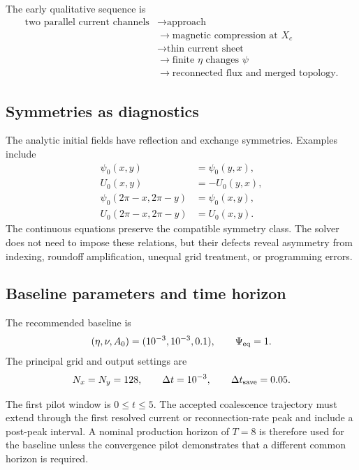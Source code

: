 \documentclass[11pt]{article}
\begin{document}
The early qualitative sequence is
\[
\begin{aligned}
\text{two parallel current channels}
&\longrightarrow \text{approach}\\
&\longrightarrow \text{magnetic compression at }X_c\\
&\longrightarrow \text{thin current sheet}\\
&\longrightarrow \text{finite }\eta\text{ changes }\psi\\
&\longrightarrow \text{reconnected flux and merged topology}.
\end{aligned}
\]

\subsection{Symmetries as diagnostics}

The analytic initial fields have reflection and exchange symmetries. Examples include
\begin{align}
\psi_0(x,y)&=\psi_0(y,x),\\
U_0(x,y)&=-U_0(y,x),\\
\psi_0(2\pi-x,2\pi-y)&=\psi_0(x,y),\\
U_0(2\pi-x,2\pi-y)&=U_0(x,y).
\end{align}
The continuous equations preserve the compatible symmetry class. The solver does not need to impose these relations, but their defects reveal asymmetry from indexing, roundoff amplification, unequal grid treatment, or programming errors.

\subsection{Baseline parameters and time horizon}

The recommended baseline is
\begin{equation}
(\eta,\nu,A_0)=(10^{-3},10^{-3},0.1),
\qquad \Psi_{\rm eq}=1.
\label{eq:baselineparams}
\end{equation}
The principal grid and output settings are
\begin{equation}
N_x=N_y=128,\qquad
\Delta t=10^{-3},\qquad
\Delta t_{\rm save}=0.05.
\end{equation}

The first pilot window is $0\le t\le5$. The accepted coalescence trajectory must extend through the first resolved current or reconnection-rate peak and include a post-peak interval. A nominal production horizon of $T=8$ is therefore used for the baseline unless the convergence pilot demonstrates that a different common horizon is required.
\end{document}
